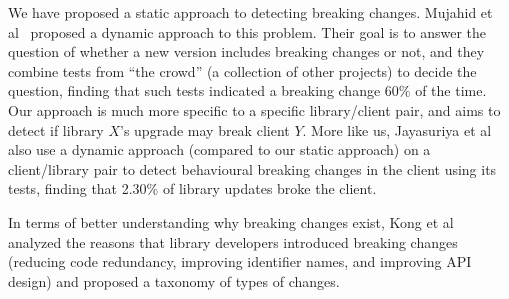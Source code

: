 We have proposed a static approach to detecting breaking changes. Mujahid et al~\cite{mujahid20:_using_other_tests_ident_break_updat} proposed a dynamic approach to this problem. Their goal is to answer the question of whether a new version includes breaking changes or not, and they combine tests from ``the crowd'' (a collection of other projects) to decide the question, finding that such tests indicated a breaking change 60\% of the time. Our approach is much more specific to a specific library/client pair, and aims to detect if library $X$'s upgrade may break client $Y$. More like us, Jayasuriya et al~\cite{jayasuriya24:_under_apis} also use a dynamic approach (compared to our static approach) on a client/library pair to detect behavioural breaking changes in the client using its tests, finding that 2.30\% of library updates broke the client.

In terms of better understanding why breaking changes exist, Kong et al~\cite{kong25:_towar_better_compr_break_chang_npm_ecosy} analyzed the reasons that library developers introduced breaking changes (reducing code redundancy, improving identifier names, and improving API design) and proposed a taxonomy of types of changes.
